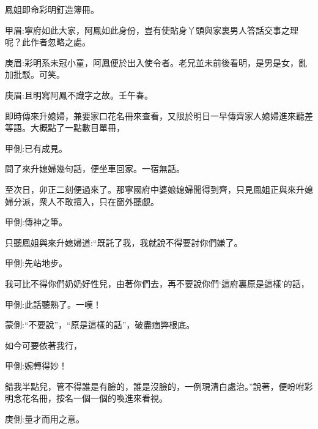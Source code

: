 \begin{parag}
    鳳姐即命彩明釘造簿冊。\begin{note}甲眉:寧府如此大家，阿鳳如此身份，豈有使貼身丫頭與家裏男人答話交事之理呢？此作者忽略之處。\end{note}\begin{note}庚眉:彩明系未冠小童，阿鳳便於出入使令者。老兄並未前後看明，是男是女，亂加批駁。可笑。\end{note}\begin{note}庚眉:且明寫阿鳳不識字之故。壬午春。\end{note}即時傳來升媳婦，兼要家口花名冊來查看，又限於明日一早傳齊家人媳婦進來聽差等語。大概點了一點數目單冊，\begin{note}甲側:已有成見。\end{note}問了來升媳婦幾句話，便坐車回家。一宿無話。
\end{parag}


\begin{parag}
    至次日，卯正二刻便過來了。那寧國府中婆娘媳婦聞得到齊，只見鳳姐正與來升媳婦分派，衆人不敢擅入，只在窗外聽覷。\begin{note}甲側:傳神之筆。\end{note}只聽鳳姐與來升媳婦道:“既託了我，我就說不得要討你們嫌了。\begin{note}甲側:先站地步。\end{note}我可比不得你們奶奶好性兒，由著你們去，再不要說你們‘這府裏原是這樣’的話，\begin{note}甲側:此話聽熟了。一嘆！\end{note}\begin{note}蒙側:“不要說”，“原是這樣的話”，破盡痼弊根底。\end{note}如今可要依著我行，\begin{note}甲側:婉轉得妙！\end{note}錯我半點兒，管不得誰是有臉的，誰是沒臉的，一例現清白處治。”說著，便吩咐彩明念花名冊，按名一個一個的喚進來看視。\begin{note}庚側:量才而用之意。\end{note}
\end{parag}


